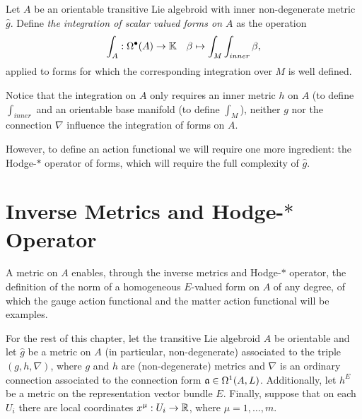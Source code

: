 \begin{definition}
Let $A$ be an orientable transitive Lie algebroid with inner non-degenerate metric $\hat g$. Define \emph{the integration of scalar valued forms on $A$} as the operation
\begin{align}
    \int_A: \Omega^\bullet(A) &\to \mathbb{K}
    & \beta \mapsto \int_M \int_{inner} \beta,
\end{align}
applied to forms for which the corresponding integration over $M$ is well defined.
\end{definition}

\begin{remark}
Notice that the integration on $A$ only requires an inner metric $h$ on $A$ (to define $\int_{inner}$ and an orientable base manifold (to define $\int_M$), neither $g$ nor the connection $\nabla$ influence the integration of forms on $A$.
\end{remark}

However, to define an action functional we will require one more ingredient: the Hodge-$*$ operator of forms, which will require the full complexity of $\hat g$.


\section{Inverse Metrics and Hodge-$*$ Operator}
\label{chIntegrationSectionHodgeInnerProduct}
A metric on $A$ enables, through the inverse metrics and Hodge-$*$ operator, the definition of the norm of a homogeneous $E$-valued form on $A$ of any degree, of which the gauge action functional and the matter action functional will be examples. 

For the rest of this chapter, let the transitive Lie algebroid $A$ be orientable and let $\hat g$ be a metric on $A$ (in particular, non-degenerate) associated to the triple $(g, h, \nabla)$, where $g$ and $h$ are (non-degenerate) metrics and $\nabla$ is an ordinary connection associated to the connection form $\mathfrak{a} \in \Omega^1(A, L)$. Additionally, let $h^E$ be a metric on the representation vector bundle $E$. Finally, suppose that on each $U_i$ there are local coordinates $x^\mu: U_i \to \mathbb{R}$, where $\mu = 1, \dots, m$.

